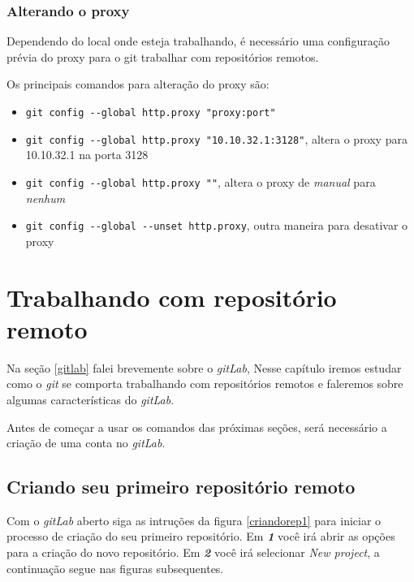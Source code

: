 \documentclass[12pt,openright,oneside,a4paper,english,brazil]{abntex2}
\begin{document}
\subsection{Alterando o proxy \label{alterandoproxy}}

Dependendo do local onde esteja trabalhando, é necessário uma configuração prévia do proxy para o git trabalhar com repositórios remotos. 

Os principais comandos para alteração do proxy são:

\begin{itemize}
	\item \verb|git config --global http.proxy "proxy:port"|
	\item \verb|git config --global http.proxy "10.10.32.1:3128"|, altera o proxy para  10.10.32.1 na porta 3128
	\item \verb|git config --global http.proxy ""|, altera o proxy de \textit{manual} para \textit{nenhum}
	\item  \verb|git config --global --unset http.proxy|, outra maneira para desativar o proxy
\end{itemize}


\chapter{Trabalhando com repositório remoto}

Na seção \ref{gitlab} falei brevemente sobre o \textit{gitLab}, Nesse capítulo iremos estudar como o \textit{git} se comporta trabalhando com repositórios remotos e faleremos sobre algumas características do \textit{gitLab}.

Antes de começar a usar os comandos das próximas seções, será necessário a criação de uma conta no \textit{gitLab}.

\section{Criando seu primeiro repositório remoto}

Com o \textit{gitLab} aberto siga as intruções da figura \ref{criandorep1} para iniciar o processo de criação do seu primeiro repositório. Em \textbf{\textit{1}} você irá abrir as opções para a criação do novo repositório. Em \textbf{\textit{2}} você irá selecionar \textit{New project}, a continuação segue nas figuras subsequentes.
\end{document}

